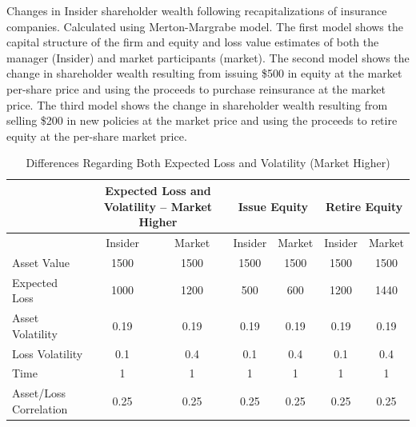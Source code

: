 \begin{table}\caption{Differences Regarding Both Expected Loss and Volatility (Market Higher)\label{tab:bothover}}
\begin{small}Changes in Insider shareholder wealth following recapitalizations of insurance companies.  Calculated using Merton-Margrabe model.  The first model shows the capital structure of the firm and equity and loss value estimates of both the manager (Insider) and market participants (market).  The second model shows the change in shareholder wealth resulting from issuing \$500 in equity at the market per-share price and using the proceeds to purchase reinsurance at the market price.  The third model shows the change in shareholder wealth resulting from selling \$200 in new policies at the market price and using the proceeds to retire equity at the per-share market price.\end{small}
\begin{center}
\begin{tabular}{p{2in}cccccc}
\toprule
           & \multicolumn{ 2}{p{2in}}{Expected Loss and Volatility -- Market Higher} & \multicolumn{ 2}{c}{Issue Equity} & \multicolumn{ 2}{c}{Retire Equity} \\ 
\midrule

           &  Insider &     Market &  Insider &     Market &  Insider &     Market \\ 
\midrule
\midrule

Asset Value &       1500 &       1500 &       1500 &       1500 &       1500 &       1500 \\ 
Expected Loss &       1000 &       1200 &        500 &        600 &       1200 &       1440 \\ 

Asset Volatility &       0.19 &       0.19 &       0.19 &       0.19 &       0.19 &       0.19 \\ 

Loss Volatility &        0.1 &        0.4 &        0.1 &        0.4 &        0.1 &        0.4 \\ 

      Time &          1 &          1 &          1 &          1 &          1 &          1 \\ 

Asset/Loss Correlation &       0.25 &       0.25 &       0.25 &       0.25 &       0.25 &       0.25 \\ 


\end{tabular}
\end{center}
\end{table}

